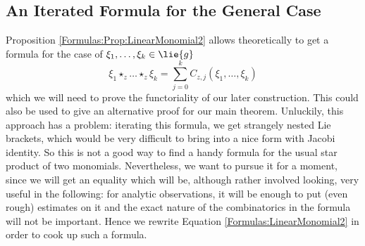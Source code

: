 %
\subsection{An Iterated Formula for the General Case}

Proposition \ref{Formulas:Prop:LinearMonomial2} allows theoretically 
to get a formula for the case of $\xi_1, \ldots, \xi_k \in \lie{g}$
\begin{equation*}
	\xi_1 \star_z \ldots \star_z \xi_k
	=
	\sum\limits_{j=0}^k
	C_{z,j} \left(
		\xi_1, \ldots, \xi_k
	\right)
\end{equation*}
which we will need to prove the functoriality of our later construction.
This could also be used to give an alternative proof for our main theorem.
Unluckily, this approach has a problem: iterating this formula, we get 
strangely nested Lie brackets, which would be very difficult to bring 
into a nice form with Jacobi identity. So this is not a 
good way to find a handy formula for the usual star product of two 
monomials. Nevertheless, we want to pursue it for a moment, since we 
will get an equality which will be, although rather involved looking, 
very useful in the following: for analytic observations, it will be 
enough to put (even rough) estimates on it and the exact nature of the 
combinatorics in the formula will not be important. Hence we rewrite 
Equation \eqref{Formulas:LinearMonomial2} in order to cook up such a 
formula.

